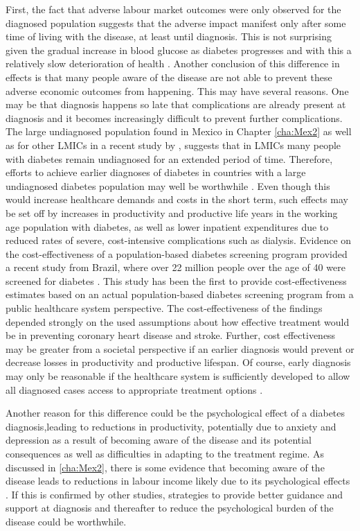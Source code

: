 First, the fact that adverse labour market outcomes were only observed for the diagnosed population suggests that the adverse impact manifest only after some time of living with the disease, at least until diagnosis. This is not surprising given the gradual increase in blood glucose as diabetes progresses and with this a relatively slow deterioration of health \parencite{Bertram2010}. Another conclusion of this difference in effects is that many people aware of the disease are not able to prevent these adverse economic outcomes from happening. This may have several reasons. One may be that diagnosis happens so late that complications are already present at diagnosis and it becomes increasingly difficult to prevent further complications. The large undiagnosed population found in Mexico in Chapter \ref{cha:Mex2} as well as for other \acp{LMIC} in a recent study by \textcite{Beagley2014}, suggests that in \acp{LMIC} many people with diabetes remain undiagnosed for an extended period of time. Therefore, efforts to achieve earlier diagnoses of diabetes in countries with a large undiagnosed diabetes population may well be worthwhile \parencite{Engelgau2012}. Even though this would increase healthcare demands and costs in the short term, such effects may be set off by increases in productivity and productive life years in the working age population with diabetes, as well as lower inpatient expenditures due to reduced rates of severe, cost-intensive complications such as dialysis. Evidence on the cost-effectiveness of a population-based diabetes screening program provided a recent study from Brazil, where over 22 million people over the age of 40 were screened for diabetes \parencite{Toscano2015}. This study has been the first to provide cost-effectiveness estimates based on an actual population-based diabetes screening program from a public healthcare system perspective. The cost-effectiveness of the findings depended strongly on the used assumptions about how effective treatment would be in preventing coronary heart disease and stroke. Further, cost effectiveness may be greater from a societal perspective if an earlier diagnosis would prevent or decrease losses in productivity and productive lifespan. Of course, early diagnosis may only be reasonable if the healthcare system is sufficiently developed to allow all diagnosed cases access to appropriate treatment options \parencite{Toscano2015,Engelgau2012}. 

Another reason for this difference could be the psychological effect of a diabetes diagnosis,leading to reductions in productivity, potentially due to anxiety and depression as a result of becoming aware of the disease and its potential consequences as well as difficulties in adapting to the treatment regime. As discussed in \ref{cha:Mex2}, there is some evidence that becoming aware of the disease leads to reductions in labour income likely due to its psychological effects \parencite{Liu2014}. If this is confirmed by other studies, strategies to provide better guidance and support at diagnosis and thereafter to reduce the psychological burden of the disease could be worthwhile.

